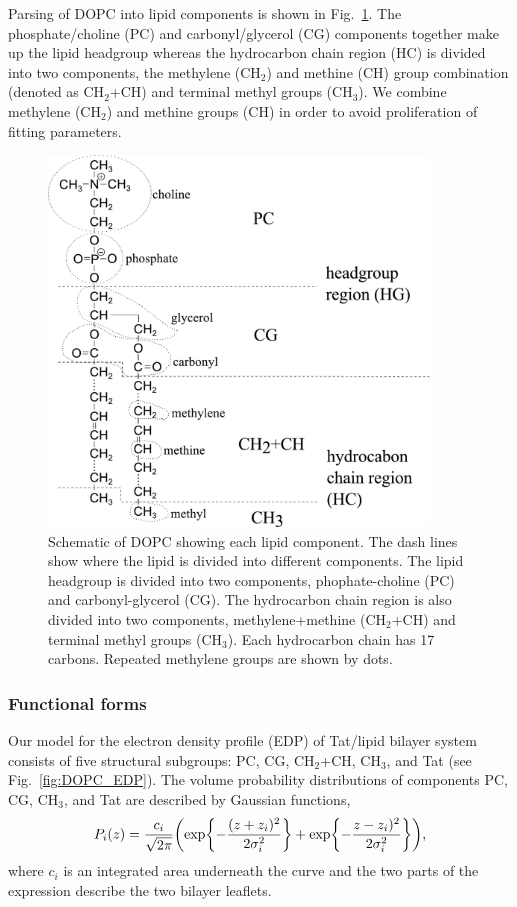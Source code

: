 Parsing of DOPC into lipid components is shown in
Fig.~\ref{fig:dopc_schematic}. The phosphate/choline (PC) and 
carbonyl/glycerol (CG) components together make up the lipid headgroup
whereas the hydrocarbon chain region (HC)
is divided into two components, the methylene (CH$_2$) and methine (CH) group
combination (denoted as CH$_2$+CH) and terminal methyl groups (CH$_3$). 
We combine methylene (CH$_2$) and methine groups (CH) in order to avoid 
proliferation of fitting parameters.

\begin{figure}[htbp]
  \centering
  \includegraphics[width=0.9\textwidth]{figures/Tat/MMs/dopc_schematic.pdf}
  \caption{Schematic of DOPC showing each lipid component. The dash lines 
           show where the lipid is divided into different components. 
           The lipid headgroup
           is divided into two components, phophate-choline (PC) and carbonyl-glycerol (CG). 
           The hydrocarbon chain region is also divided
           into two components, methylene+methine (CH$_2$+CH) and terminal methyl groups (CH$_3$).
           Each hydrocarbon chain has 17 carbons. Repeated methylene groups 
           are shown by dots.}
  \label{fig:dopc_schematic}
\end{figure}

\subsubsection{Functional forms}
Our model for the electron density profile (EDP)
of Tat/lipid bilayer system consists of five structural subgroups: PC, CG,
CH$_2$+CH, CH$_3$, and Tat (see Fig.~\ref{fig:DOPC_EDP}).
The volume probability distributions of components PC, CG, CH$_3$, and Tat 
are described by Gaussian functions,
\begin{equation}
  P_i(z)=\frac{c_i}{\sqrt{2\pi}}\mathopen{}\left( 
    \exp\mathopen{}\left\lbrace -\frac{(z+z_i)^2}{2\sigma_i^2} \right\rbrace\mathclose{}
	+ \exp\mathopen{}\left\lbrace -\frac{z-z_i)^2}{2\sigma_i^2} \right\rbrace\mathclose{}
   \right)\mathclose{},
\end{equation}
where $c_i$ is an integrated area underneath the curve and the two parts of the 
expression describe the two bilayer leaflets. 

